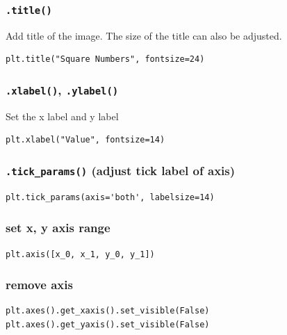 \documentclass[12pt]{book}
\begin{document}
\subsubsection{\texttt{.title()}}
\label{sec:org8225457}
Add title of the image. The size of the title can also be adjusted.
\begin{verbatim}
plt.title("Square Numbers", fontsize=24)
\end{verbatim}

\subsubsection{\texttt{.xlabel()}, \texttt{.ylabel()}}
\label{sec:orgf38f9ea}
Set the x label and y label
\begin{verbatim}
plt.xlabel("Value", fontsize=14)
\end{verbatim}

\subsubsection{\texttt{.tick\_params()} (adjust tick label of axis)}
\label{sec:org2b55228}
\begin{verbatim}
plt.tick_params(axis='both', labelsize=14)
\end{verbatim}

\subsubsection{set x, y axis range}
\label{sec:orgbb63d18}
\begin{verbatim}
plt.axis([x_0, x_1, y_0, y_1])
\end{verbatim}

\subsubsection{remove axis}
\label{sec:org9ee6535}
\begin{verbatim}
plt.axes().get_xaxis().set_visible(False)
plt.axes().get_yaxis().set_visible(False)
\end{verbatim}
\end{document}
